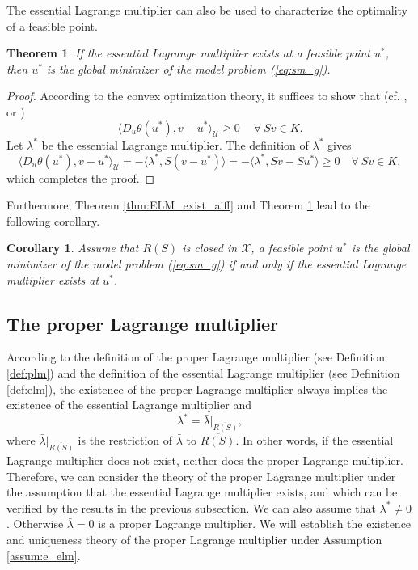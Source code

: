 \documentclass[leqno]{amsart}
\newtheorem{theorem}{Theorem}[section]
\newtheorem{Corollary}[Theorem]{Corollary}
\theoremstyle{definition}
\begin{document}
The essential Lagrange multiplier can also be used to characterize the optimality of a feasible point.

\begin{theorem}\label{thm:optimality}
If the essential Lagrange multiplier exists at a feasible point $u^*$, then $u^*$ is the global minimizer of the model problem (\ref{eq:sm_g}).
\end{theorem}
\begin{proof}
According to the convex optimization theory, it suffices to show that (cf. \cite[Proposition 26.5]{bauschke2011convex}, \cite[Proposition 2.1, Chapter II]{ekeland1999convex} or \cite[Corollary 4.20]{jahn2020introduction}) 
$$ \langle D_u\theta(u^*), v - u^*\rangle_\mathcal{U} \geq 0\quad\ \forall\ Sv\in K.$$
Let $\lambda^*$ be the essential Lagrange multiplier. The definition of $\lambda^*$ gives
$$
\langle D_u\theta(u^*), v - u^*\rangle_\mathcal{U} 
 = -\langle \lambda^{*}, S(v - u^*)\rangle 
 =  -\langle \lambda^{*}, Sv - Su^*\rangle
 \geq 0\quad \forall\ Sv\in K,
 $$
 which completes the proof.
\end{proof}

Furthermore, Theorem \ref{thm:ELM_exist_aiff} and Theorem \ref{thm:optimality} lead to the following corollary.
\begin{Corollary}
Assume that $R(S)$ is closed in $\mathcal{X}$, a feasible point $u^*$ is the global minimizer of the model problem (\ref{eq:sm_g}) if and only if the essential Lagrange multiplier exists at $u^*$.
\end{Corollary}

\subsection{The proper Lagrange multiplier} According to the definition of the proper Lagrange multiplier (see Definition \ref{def:plm}) and the definition of the essential Lagrange multiplier (see Definition \ref{def:elm}), the existence of the proper Lagrange multiplier always implies the existence of the essential Lagrange multiplier and 
\begin{equation}\label{eq:plm-elm}
\lambda^* = \bar{\lambda}|_{\overline{R(S)}},
\end{equation}
where $\bar{\lambda}|_{\overline{R(S)}}$ is the restriction of $\bar{\lambda}$ to $\overline{R(S)}$. In other words, if the essential Lagrange multiplier does not exist, neither does the proper Lagrange multiplier. Therefore, we can consider the theory of the proper Lagrange multiplier under the assumption that the essential Lagrange multiplier exists, and which can be verified by the results in the previous subsection. We can also assume that $\lambda^* \neq 0$. Otherwise $\bar{\lambda} = 0$ is a proper Lagrange multiplier.  We will establish the existence and uniqueness theory of the proper Lagrange multiplier under Assumption \ref{assum:e_elm}. 
\end{document}

